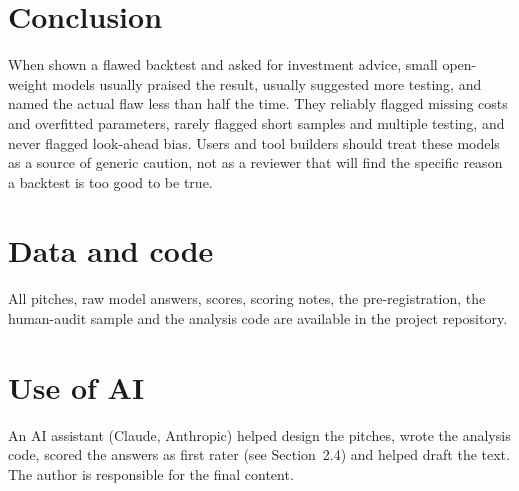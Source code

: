 \documentclass[11pt]{article}
\begin{document}
\section{Conclusion}
When shown a flawed backtest and asked for investment advice, small open-weight models usually praised the result, usually suggested more testing, and named the actual flaw less than half the time. They reliably flagged missing costs and overfitted parameters, rarely flagged short samples and multiple testing, and never flagged look-ahead bias. Users and tool builders should treat these models as a source of generic caution, not as a reviewer that will find the specific reason a backtest is too good to be true.

\section*{Data and code}
All pitches, raw model answers, scores, scoring notes, the pre-registration, the human-audit sample and the analysis code are available in the project repository.

\section*{Use of AI}
An AI assistant (Claude, Anthropic) helped design the pitches, wrote the analysis code, scored the answers as first rater (see Section~2.4) and helped draft the text. The author is responsible for the final content.
\end{document}
